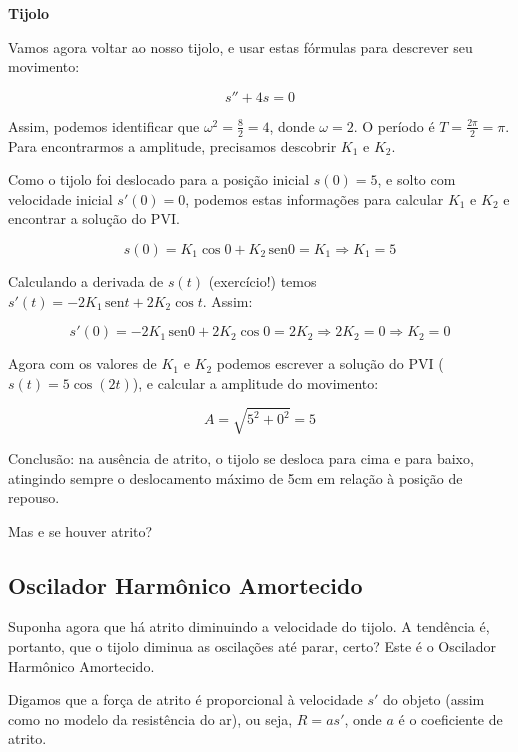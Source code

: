 \documentclass[a4paper]{article}
\providecommand{\sin}{} \renewcommand{\sin}{\hspace{2pt}\mathrm{sen}}
\begin{document}
{\bf Tijolo}

Vamos agora voltar ao nosso tijolo, e usar estas fórmulas para
descrever seu movimento:

\begin{displaymath}
  s''+4s=0
\end{displaymath}

Assim, podemos identificar que $\omega^2=\frac{8}{2}=4$, donde
$\omega=2$. O período é $T=\frac{2\pi}{2}=\pi$. Para encontrarmos a
amplitude, precisamos descobrir $K_1$ e $K_2$.

Como o tijolo foi deslocado para a posição inicial $s(0)=5$, e solto
com velocidade inicial $s'(0)=0$, podemos estas informações para
calcular  $K_1$ e $K_2$ e encontrar a solução do PVI.

\begin{displaymath}
  s(0) = K_1 \cos0 + K_2 \sin 0 = K_1 \Rightarrow K_1 = 5
\end{displaymath}

Calculando a derivada de $s(t)$ (exercício!) temos
$s'(t) = -2K_1 \sin t + 2K_2 \cos t$. Assim:

\begin{displaymath}
  s'(0) = -2K_1 \sin 0 + 2K_2 \cos 0 = 2K_2 \Rightarrow 2K_2 = 0
  \Rightarrow K_2=0
\end{displaymath}

Agora com os valores de $K_1$ e $K_2$ podemos escrever a solução do
PVI ($s(t) = 5\cos(2t)$), e calcular a amplitude do movimento:

\begin{displaymath}
  A = \sqrt{5^2 +0^2} = 5
\end{displaymath}

Conclusão: na ausência de atrito, o tijolo se desloca para cima e para
baixo, atingindo sempre o deslocamento máximo de 5cm em relação à
posição de repouso.

Mas e se houver atrito?

\subsection{Oscilador Harmônico Amortecido}

Suponha agora que há atrito diminuindo a velocidade do tijolo. A
tendência é, portanto, que o tijolo diminua as oscilações até parar,
certo? Este é o Oscilador Harmônico Amortecido.

Digamos que a força de atrito é proporcional à velocidade $s'$ do
objeto (assim como no modelo da resistência do ar), ou seja, $R=as'$,
onde $a$ é o coeficiente de atrito.%
\end{document}
